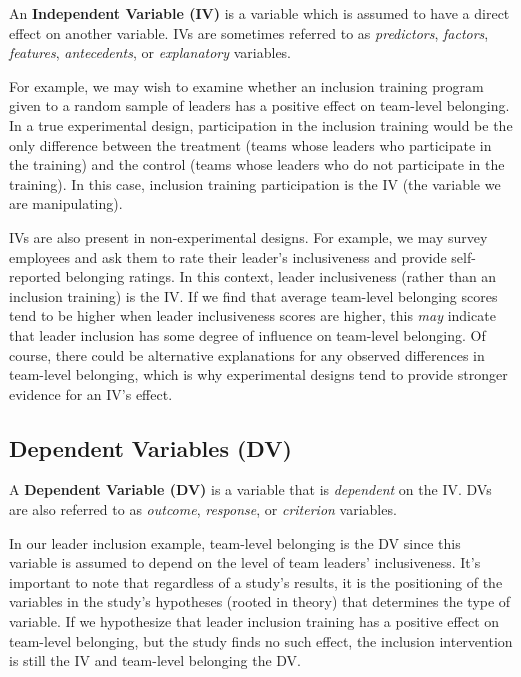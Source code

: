 \documentclass[]{book}
\begin{document}
An \textbf{Independent Variable (IV)} is a variable which is assumed to have a direct effect on another variable. IVs are sometimes referred to as \emph{predictors}, \emph{factors}, \emph{features}, \emph{antecedents}, or \emph{explanatory} variables.

For example, we may wish to examine whether an inclusion training program given to a random sample of leaders has a positive effect on team-level belonging. In a true experimental design, participation in the inclusion training would be the only difference between the treatment (teams whose leaders who participate in the training) and the control (teams whose leaders who do not participate in the training). In this case, inclusion training participation is the IV (the variable we are manipulating).

IVs are also present in non-experimental designs. For example, we may survey employees and ask them to rate their leader's inclusiveness and provide self-reported belonging ratings. In this context, leader inclusiveness (rather than an inclusion training) is the IV. If we find that average team-level belonging scores tend to be higher when leader inclusiveness scores are higher, this \emph{may} indicate that leader inclusion has some degree of influence on team-level belonging. Of course, there could be alternative explanations for any observed differences in team-level belonging, which is why experimental designs tend to provide stronger evidence for an IV's effect.

\hypertarget{dependent-variables-dv}{%
\subsection{Dependent Variables (DV)}\label{dependent-variables-dv}}

A \textbf{Dependent Variable (DV)} is a variable that is \emph{dependent} on the IV. DVs are also referred to as \emph{outcome}, \emph{response}, or \emph{criterion} variables.

In our leader inclusion example, team-level belonging is the DV since this variable is assumed to depend on the level of team leaders' inclusiveness. It's important to note that regardless of a study's results, it is the positioning of the variables in the study's hypotheses (rooted in theory) that determines the type of variable. If we hypothesize that leader inclusion training has a positive effect on team-level belonging, but the study finds no such effect, the inclusion intervention is still the IV and team-level belonging the DV.
\end{document}
